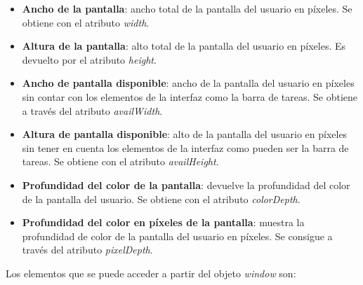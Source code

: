 \begin{itemize} 
    \item \textbf{Ancho de la pantalla}: ancho total de la pantalla del usuario en píxeles. Se obtiene con el atributo \textit{width}.
    \item \textbf{Altura de la pantalla}: alto total de la pantalla del usuario en píxeles. Es devuelto por el atributo \textit{height}.
    \item \textbf{Ancho de pantalla disponible}: ancho de la pantalla del usuario en píxeles sin contar con los elementos de la interfaz como la barra de tareas. Se obtiene a través del atributo \textit{availWidth}.
    \item \textbf{Altura de pantalla disponible}: alto de la pantalla del usuario en píxeles sin tener en cuenta los elementos de la interfaz como pueden ser la barra de tareas. Se obtiene con el atributo \textit{availHeight}.
    \item \textbf{Profundidad del color de la pantalla}: devuelve la profundidad del color de la pantalla del usuario. Se obtiene con el atributo \textit{colorDepth}.
    \item \textbf{Profundidad del color en píxeles de la pantalla}: muestra la profundidad de color de la pantalla del usuario en píxeles. Se consigue a través del atributo \textit{pixelDepth}.
\end{itemize}
\noindent  Los elementos que se puede acceder a partir del objeto \textit{window} son:
